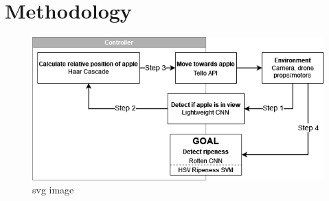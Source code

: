 \section{Methodology}

\begin{figure}[htbp]
    \fontsize{7}{5}\selectfont
    \centering
    \includegraphics[width=\columnwidth,keepaspectratio]
    {./figures/fruit-fly-model-diagram}
    \caption{svg image}
\end{figure}




